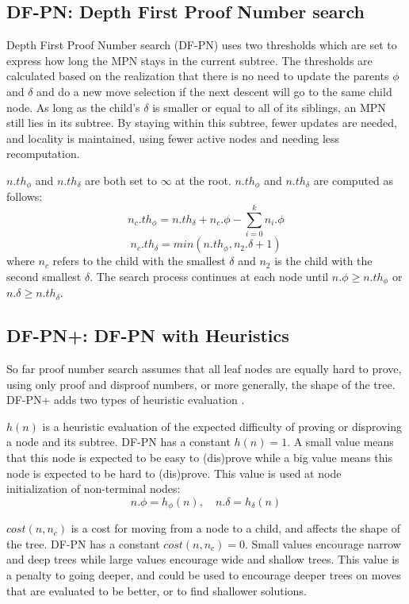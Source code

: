 \subsection{DF-PN: Depth First Proof Number search} \label{sec:DF-PN}

Depth First Proof Number search (DF-PN)\cite{nagai1999-DFPN} uses two thresholds which are set to express how long the MPN stays in the current subtree. The thresholds are calculated based on the realization that there is no need to update the parents $\phi$ and $\delta$ and do a new move selection if the next descent will go to the same child node. As long as the child's $\delta$ is smaller or equal to all of its siblings, an MPN still lies in its subtree. By staying within this subtree, fewer updates are needed, and locality is maintained, using fewer active nodes and needing less recomputation.

$n.th_\phi$ and $n.th_\delta$ are both set to $\infty$ at the root. $n.th_\phi$ and $n.th_\delta$ are computed as follows: $$n_c.th_\phi = n.th_\delta + n_c.\phi - \displaystyle\sum\limits_{i=0}^k n_i. \phi$$ $$n_c.th_\delta = min(n.th_\phi, n_2.\delta + 1)$$ where $n_c$ refers to the child with the smallest $\delta$ and $n_2$ is the child with the second smallest $\delta$. The search process continues at each node until $n.\phi \geq n.th_\phi$ or $n.\delta \geq n.th_\delta$.


\subsection{DF-PN+: DF-PN with Heuristics} \label{sec:DF-PN+}

So far proof number search assumes that all leaf nodes are equally hard to prove, using only proof and disproof numbers, or more generally, the shape of the tree. DF-PN+ adds two types of heuristic evaluation \cite{nagai-thesis}.

$h(n)$ is a heuristic evaluation of the expected difficulty of proving or disproving a node and its subtree. DF-PN has a constant $h(n) = 1$. A small value means that this node is expected to be easy to (dis)prove while a big value means this node is expected to be hard to (dis)prove. This value is used at node initialization of non-terminal nodes: $$n.\phi = h_\phi(n), \quad n.\delta = h_\delta(n)$$

$cost(n, n_c)$ is a cost for moving from a node to a child, and affects the shape of the tree. DF-PN has a constant $cost(n, n_c) = 0$. Small values encourage narrow and deep trees while large values encourage wide and shallow trees. This value is a penalty to going deeper, and could be used to encourage deeper trees on moves that are evaluated to be better, or to find shallower solutions.

